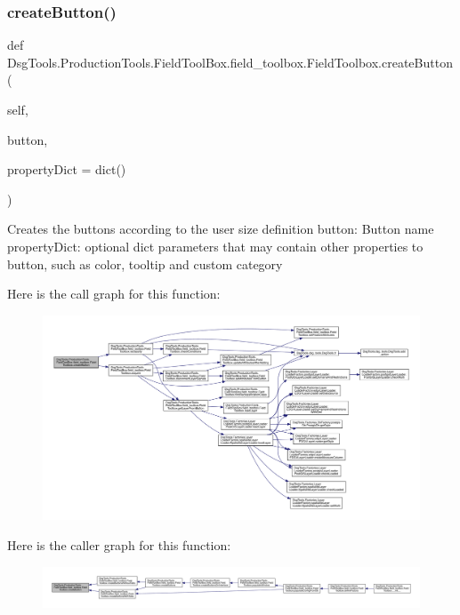\subsubsection{\texorpdfstring{create\+Button()}{createButton()}}
{\footnotesize\ttfamily def Dsg\+Tools.\+Production\+Tools.\+Field\+Tool\+Box.\+field\+\_\+toolbox.\+Field\+Toolbox.\+create\+Button (\begin{DoxyParamCaption}\item[{}]{self,  }\item[{}]{button,  }\item[{}]{property\+Dict = {\ttfamily dict()} }\end{DoxyParamCaption})}

\begin{DoxyVerb}Creates the buttons according to the user size definition
button: Button name
propertyDict: optional dict parameters that may contain other properties to button, such as color, tooltip and custom category
\end{DoxyVerb}
 Here is the call graph for this function\+:
\nopagebreak
\begin{figure}[H]
\begin{center}
\leavevmode
\includegraphics[width=350pt]{class_dsg_tools_1_1_production_tools_1_1_field_tool_box_1_1field__toolbox_1_1_field_toolbox_a0a2d77a158704eb6902759a909b06546_cgraph}
\end{center}
\end{figure}
Here is the caller graph for this function\+:
\nopagebreak
\begin{figure}[H]
\begin{center}
\leavevmode
\includegraphics[width=350pt]{class_dsg_tools_1_1_production_tools_1_1_field_tool_box_1_1field__toolbox_1_1_field_toolbox_a0a2d77a158704eb6902759a909b06546_icgraph}
\end{center}
\end{figure}
